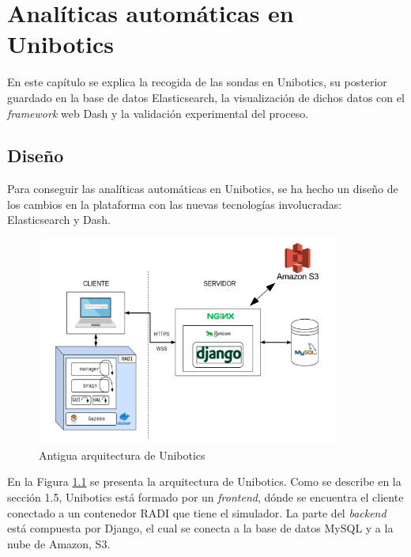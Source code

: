 \chapter{Analíticas automáticas en Unibotics}
\label{analiticas}
En este capítulo se explica la recogida de las sondas en Unibotics, su posterior guardado en la base de datos Elasticsearch, la visualización de dichos datos con el \textit{framework} web Dash y la validación experimental del proceso.

\section{Diseño}
Para conseguir las analíticas automáticas en Unibotics, se ha hecho un diseño de los cambios en la plataforma con las nuevas tecnologías involucradas: Elasticsearch y Dash.\\

\begin{figure}[H]
    \centering
    \includegraphics[width=10cm, keepaspectratio]{img/grafico.png}
    \caption{Antigua arquitectura de Unibotics}
    \label{fig:grafico}
\end{figure}

En la Figura \ref{fig:grafico} se presenta la arquitectura de Unibotics. Como se describe en la sección 1.5, Unibotics está formado por un \textit{frontend}, dónde se encuentra el cliente conectado a un contenedor RADI que tiene el simulador. La parte del \textit{backend}
está compuesta por Django, el cual se conecta a la base de datos MySQL y a la nube de Amazon, S3.

